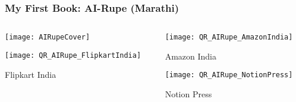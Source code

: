 \begin{frame}[fragile]\frametitle{My First Book: AI-Rupe (Marathi)}
\begin{columns}
    \begin{column}[T]{0.5\linewidth}
		\begin{center}
		\texttt{[image: AIRupeCover]}
		\end{center}	

		\begin{center}
		\texttt{[image: QR\_AIRupe\_FlipkartIndia]}
		
		Flipkart India
		\end{center}			
    \end{column}
    \begin{column}[T]{0.5\linewidth}
		\begin{center}
		\texttt{[image: QR\_AIRupe\_AmazonIndia]}
		
		Amazon India
		\end{center}	
		
		\begin{center}
		\texttt{[image: QR\_AIRupe\_NotionPress]}
		
		Notion Press
		\end{center}			
    \end{column}
  \end{columns}
  
\end{frame}